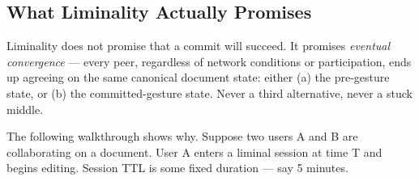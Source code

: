 \subsection{What Liminality Actually Promises}

Liminality does not promise that a commit will succeed. It promises \emph{eventual convergence} --- every peer, regardless of network conditions or participation, ends up agreeing on the same canonical document state: either (a) the pre-gesture state, or (b) the committed-gesture state. Never a third alternative, never a stuck middle.

The following walkthrough shows why. Suppose two users A and B are collaborating on a document. User A enters a liminal session at time T and begins editing. Session TTL is some fixed duration --- say 5 minutes.


